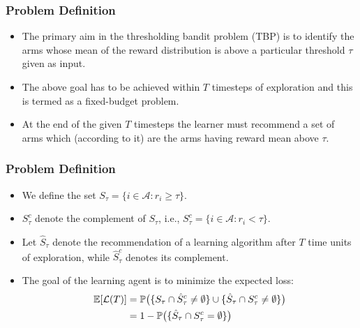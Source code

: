 \begin{frame}
\frametitle{Problem Definition}
\begin{itemize}
\item<1-> The primary aim in the thresholding bandit problem (TBP) is to identify the arms whose mean of the reward distribution is above a particular threshold $\tau$ given as input.
\item<2-> The above goal has to be achieved within $T$ timesteps of exploration and this is termed as a fixed-budget problem.
\item<3-> At the end of the given $T$ timesteps the learner must recommend a set of arms which (according to it) are the arms having reward mean above $\tau$.
\end{itemize}
\end{frame}

\begin{frame}
\frametitle{Problem Definition}
\begin{itemize}
\item<1-> We define the set $S_{\tau}=\lbrace i\in \mathcal{A}: r_{i}\geq \tau \rbrace$. 
\item<2-> $S_\tau^c$ denote the complement of $S_\tau$, i.e.,  $S_{\tau}^{c}=\lbrace i\in \mathcal{A}: r_{i} < \tau \rbrace$. 
\item<3-> Let $\hat{S}_{\tau}$ denote the recommendation of a learning algorithm after $T$ time units of exploration, while $\hat{S}_{\tau}^c$ denotes its complement.


\item<4-> The goal of the learning agent is to minimize the expected loss:
\begin{align*}
\mathbb{E}[\mathcal{L}(T)] &= \mathbb{P}\big(\lbrace S_{\tau}\cap \hat{S}_{\tau}^{c} \neq \emptyset \rbrace  \cup   \lbrace \hat{S}_{\tau}\cap S_{\tau}^{c} \neq \emptyset\rbrace\big) \\
& = 1 - \mathbb{P}\big(\lbrace \hat{S}_{\tau}\cap {S}_{\tau}^{c} = \emptyset \rbrace\big)
\end{align*}
\end{itemize}
\end{frame}

